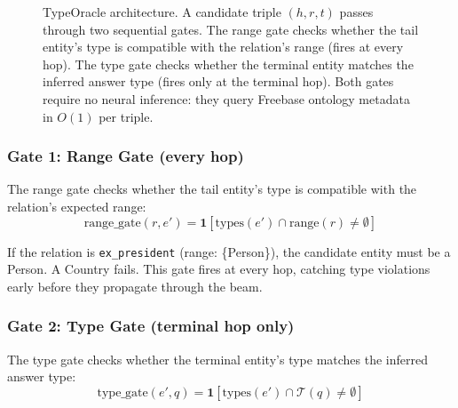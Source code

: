 \begin{figure}[htpb]
{
  }%
  \caption[TypeOracle architecture]{TypeOracle architecture. A candidate triple $(h, r, t)$ passes through two sequential gates. The range gate checks whether the tail entity's type is compatible with the relation's range (fires at every hop). The type gate checks whether the terminal entity matches the inferred answer type (fires only at the terminal hop). Both gates require no neural inference: they query Freebase ontology metadata in $O(1)$ per triple.}
  \label{fig:oracle_arch}
\end{figure}

\subsubsection{Gate 1: Range Gate (every hop)}

The range gate checks whether the tail entity's type is compatible with the relation's
expected range:
\begin{equation}
  \text{range\_gate}(r, e') = \mathbf{1}\!\left[
    \text{types}(e') \cap \text{range}(r) \neq \emptyset
  \right]
  \label{eq:range_gate}
\end{equation}

If the relation is \texttt{ex\_president} (range: \{Person\}), the candidate entity must
be a Person. A Country fails. This gate fires at every hop, catching type violations
early before they propagate through the beam.

\subsubsection{Gate 2: Type Gate (terminal hop only)}

The type gate checks whether the terminal entity's type matches the inferred answer
type:
\begin{equation}
  \text{type\_gate}(e', q) = \mathbf{1}\!\left[
    \text{types}(e') \cap \mathcal{T}(q) \neq \emptyset
  \right]
  \label{eq:type_gate}
\end{equation}

